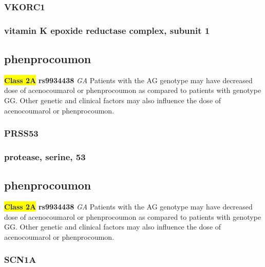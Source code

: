 \documentclass{book}
\begin{document}
\subsubsection{ VKORC1 }
\subsubsection{ vitamin K epoxide reductase complex, subunit 1 }

\subsection{ phenprocoumon }


\begin{center}


\textbf{\colorbox{yellow} {Class 2A}} \textbf{ rs9934438 } \textit{ GA }
Patients with the AG genotype may have decreased dose of acenocoumarol or phenprocoumon as compared to patients with genotype GG. Other genetic and clinical factors may also influence the dose of acenocoumarol or phenprocoumon.


\end{center}






\subsubsection{ PRSS53 }
\subsubsection{ protease, serine, 53 }

\subsection{ phenprocoumon }


\begin{center}


\textbf{\colorbox{yellow} {Class 2A}} \textbf{ rs9934438 } \textit{ GA }
Patients with the AG genotype may have decreased dose of acenocoumarol or phenprocoumon as compared to patients with genotype GG. Other genetic and clinical factors may also influence the dose of acenocoumarol or phenprocoumon.


\end{center}






\subsubsection{ SCN1A }
\end{document}
